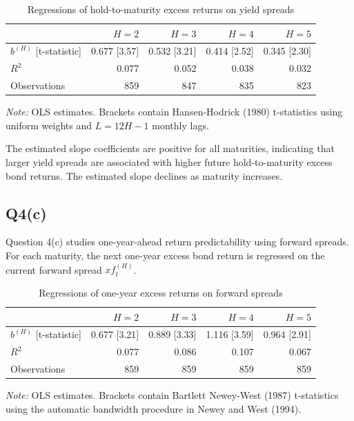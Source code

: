 \documentclass{article}
\begin{document}
\begin{table}[H]
\centering
\caption{Regressions of hold-to-maturity excess returns on yield spreads}
\label{tab:q4b}
\begin{tabular}{lrrrr}
\toprule
 & $H=2$ & $H=3$ & $H=4$ & $H=5$ \\
\midrule
$b^{(H)}$ [t-statistic] & 0.677 [3.57] & 0.532 [3.21] & 0.414 [2.52] & 0.345 [2.30] \\
$R^2$ & 0.077 & 0.052 & 0.038 & 0.032 \\
Observations & 859 & 847 & 835 & 823 \\
\bottomrule
\end{tabular}
\begin{minipage}{0.92\textwidth}
\footnotesize\textit{Note:} OLS estimates. Brackets contain Hansen-Hodrick (1980) t-statistics using uniform weights and $L=12H-1$ monthly lags.
\end{minipage}
\end{table}

The estimated slope coefficients are positive for all maturities, indicating that larger yield spreads are associated with higher future hold-to-maturity excess bond returns. The estimated slope declines as maturity increases.


\subsection{Q4(c)}

Question 4(c) studies one-year-ahead return predictability using forward spreads. For each maturity, the next one-year excess bond return is regressed on the current forward spread $xf_t^{(H)}$. 

\begin{table}[H]
\centering
\caption{Regressions of one-year excess returns on forward spreads}
\label{tab:q4c}
\begin{tabular}{lrrrr}
\toprule
 & $H=2$ & $H=3$ & $H=4$ & $H=5$ \\
\midrule
$b^{(H)}$ [t-statistic] & 0.677 [3.21] & 0.889 [3.33] & 1.116 [3.59] & 0.964 [2.91] \\
$R^2$ & 0.077 & 0.086 & 0.107 & 0.067 \\
Observations & 859 & 859 & 859 & 859 \\
\bottomrule
\end{tabular}
\begin{minipage}{0.92\textwidth}
\footnotesize\textit{Note:} OLS estimates. Brackets contain Bartlett Newey-West (1987) t-statistics using the automatic bandwidth procedure in Newey and West (1994).
\end{minipage}
\end{table}
\end{document}
